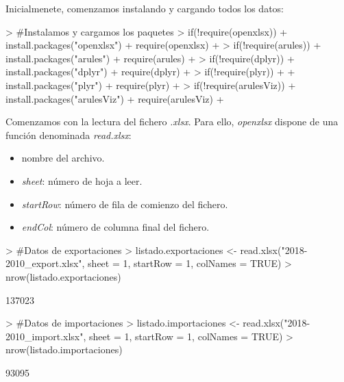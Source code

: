 \documentclass [a4paper] {article}
\begin{document}
Inicialmenete, comenzamos instalando y cargando todos los datos:
\begin{Schunk}
\begin{Sinput}
> #Instalamos y cargamos los paquetes
> if(!require(openxlsx)){
+     install.packages("openxlsx")
+     require(openxlsx)
+ }
> if(!require(arules)){
+     install.packages("arules")
+     require(arules)
+ }
> if(!require(dplyr)){
+     install.packages("dplyr")
+     require(dplyr)
+ }
> if(!require(plyr))
+ {
+     install.packages("plyr")
+     require(plyr)
+ }
> if(!require(arulesViz)){
+     install.packages("arulesViz")
+     require(arulesViz)
+ }
\end{Sinput}
\end{Schunk}
\newpage
Comenzamos con la lectura del fichero \textit{.xlsx}. Para ello, \textit{openxlsx} dispone de una función denominada \textit{read.xlsx}:
\begin{itemize}
    \item nombre del archivo.
    \item \textit{sheet}: número de hoja a leer.
    \item \textit{startRow}: número de fila de comienzo del fichero.
    \item \textit{endCol}: número de columna final del fichero.
\end{itemize}
{\footnotesize
\begin{Schunk}
\begin{Sinput}
> #Datos de exportaciones
> listado.exportaciones <- read.xlsx("2018-2010_export.xlsx", sheet = 1, startRow = 1, colNames = TRUE)
> nrow(listado.exportaciones)
\end{Sinput}
\begin{Soutput}
[1] 137023
\end{Soutput}
\begin{Sinput}
> #Datos de importaciones
> listado.importaciones <- read.xlsx("2018-2010_import.xlsx", sheet = 1, startRow = 1, colNames = TRUE)
> nrow(listado.importaciones)
\end{Sinput}
\begin{Soutput}
[1] 93095
\end{Soutput}
\end{Schunk}
}
\end{document}
